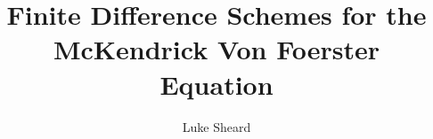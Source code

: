 \documentclass[11pt, a4paper]{report}
\title{Finite Difference Schemes for the McKendrick Von Foerster Equation}
\author{Luke Sheard}
\theoremstyle{definition}
\theoremstyle{plain}
\theoremstyle{remark}
\begin{document}
  \def\biblio{}
  \raggedright
  \allowdisplaybreaks


  

  

  

  

  \begin{appendix}
    
  \end{appendix}

  \newpage
  
  
\end{document}
